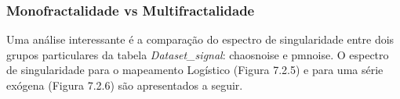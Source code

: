 \begin{figure}[ht!]
	\vspace{0mm}	%
	\begin{center}
	\end{center}
	\vspace{-2mm}	%
	\label{ex6_fig1}
\end{figure}


\subsubsection*{Monofractalidade vs Multifractalidade}

Uma análise interessante é a comparação do espectro de singularidade entre dois grupos particulares da tabela \textit{Dataset\_signal}: chaosnoise e pmnoise. O espectro de singularidade para o mapeamento Logístico (Figura 7.2.5) e para uma série exógena (Figura 7.2.6) são apresentados a seguir.


